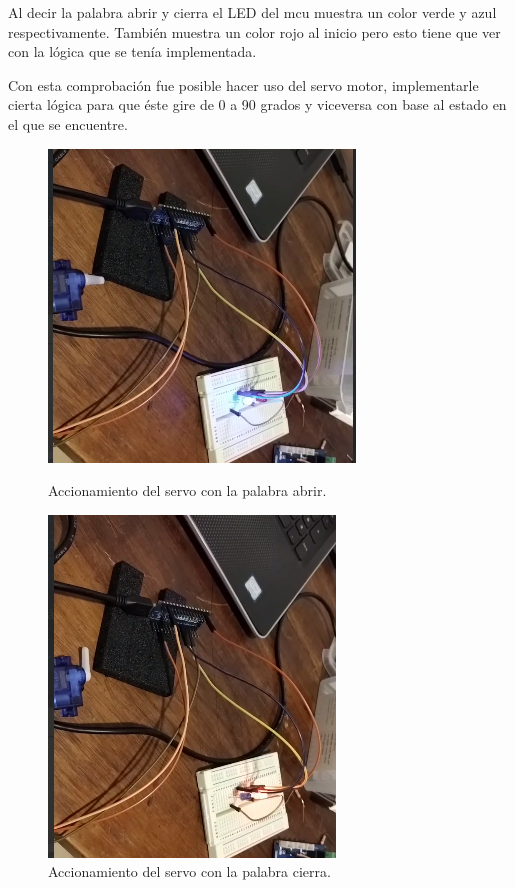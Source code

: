 Al decir la palabra abrir y cierra el LED del mcu muestra un color verde y azul respectivamente. También muestra un color rojo al inicio pero esto tiene que ver con la lógica que se tenía implementada.\par
Con esta comprobación fue posible hacer uso del servo motor, implementarle cierta lógica para que éste gire de 0 a 90 grados y viceversa con base al estado en el que se encuentre.
\begin{figure}[H]
   \begin{minipage}{0.48\textwidth}
     \centering
    \includegraphics[width=.55\linewidth]{Img/abrir_st.png}
    \caption{Accionamiento del servo con la palabra abrir.}
    \label{abrir_st}
   \end{minipage}\hfill
   \begin{minipage}{0.48\textwidth}
     \centering
    \includegraphics[width=.55\linewidth]{Img/cierra_st.png}
    \caption{Accionamiento del servo con la palabra cierra.}
    \label{cierra_st}     
   \end{minipage}
\end{figure}

